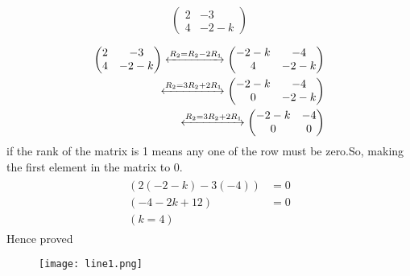 \documentclass[12pt]{article}
\newcommand{\myvec}[1]{\ensuremath{\begin{pmatrix}#1\end{pmatrix}}}
\providecommand{\brak}[1]{\ensuremath{\left(#1\right)}}
\begin{document}
\begin{align}
\begin{split}
\myvec{
2 & -3
 \\
4 & -2-k 
}
\end{split}
\end{align}
\begin{align}
\label{eq:chem_balance_mat_row}
\myvec{
2 & -3
\\
4 & -2-k
}
 \xleftrightarrow[]{R_2 = R_2-2R_1}
\myvec{
-2-k & -4
\\
4 & -2-k
}
\\
\xleftrightarrow[]{R_2 = 3R_2+2R_1}
\myvec{
-2-k & -4
\\
0 & -2-k
}
\\
\xleftrightarrow[]{R_2 = 3R_2+2R_1}
\myvec{
-2-k & -4
\\
0 & 0
}
\end{align}
if the rank of the matrix is 1 means any one of the row must be zero.So, making the first element in the matrix to 0.
\begin{align}
\begin{split}
\brak{2(-2-k)-3(-4)}&=0
\\
\brak{-4-2k+12}&=0
\\
\brak{k=4} 
\end{split}
\end{align}
Hence proved

\begin{figure}[ht!]
	  \centering 
	  \texttt{[image: line1.png]}
	  \caption{}
	  \label{fig:line1.png}
	  \end{figure} 	 
		  
\end{document}
